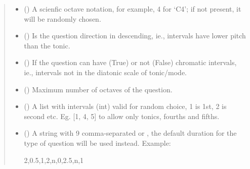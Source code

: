 \documentclass[letterpaper,10pt,english]{sphinxmanual}
\begin{document}
\begin{fulllineitems}
\begin{fulllineitems}
\begin{quote}
\begin{description}
\begin{itemize}
\item {} 
 () \textendash{} A scienfic octave notation, for example, 4 for ‘C4’;
if not present, it will be randomly chosen.

\item {} 
 () \textendash{} Is the question direction in descending, ie.,
intervals have lower pitch than the tonic.

\item {} 
 () \textendash{} If the question can have (True) or not (False)
chromatic intervals, ie., intervals not in the diatonic scale
of tonic/mode.

\item {} 
 () \textendash{} Maximum number of octaves of the question.

\item {} 
 () \textendash{} A list with intervals (int) valid for
random choice, 1 is 1st, 2 is second etc. Eg. {[}1, 4, 5{]} to
allow only tonics, fourths and fifths.

\item {} 
 () \textendash{} 
A string with 9 comma-separated  or
, the
default duration for the type of question will be used instead.
Example:

%
\begin{sphinxVerbatim}[commandchars=\\\{\}]
\PYGZdq{}2,0.5,1,2,n,0,2.5,n,1\PYGZdq{}
\end{sphinxVerbatim}



\end{itemize}
\end{description}
\end{quote}
\end{fulllineitems}
\end{fulllineitems}
\end{document}
